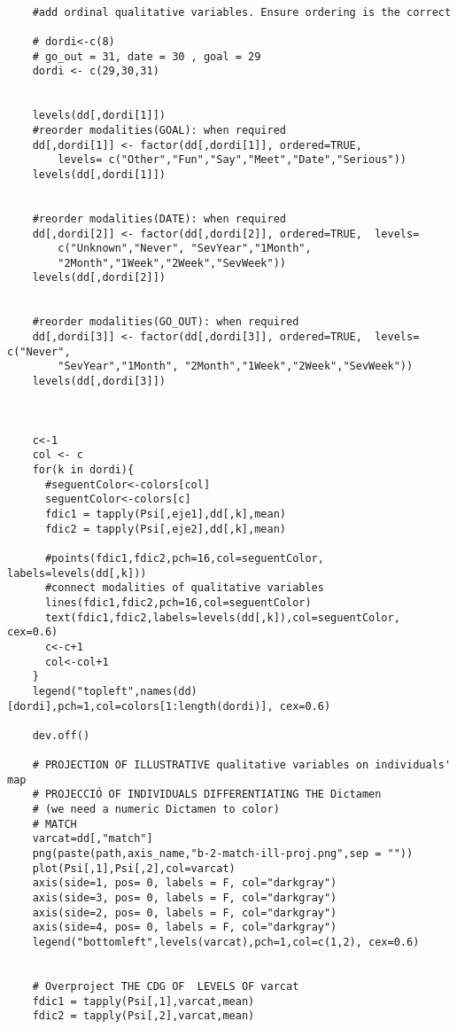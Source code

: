 \begin{verbatim}
    
    #add ordinal qualitative variables. Ensure ordering is the correct
    
    # dordi<-c(8)
    # go_out = 31, date = 30 , goal = 29
    dordi <- c(29,30,31)
    
    
    levels(dd[,dordi[1]])
    #reorder modalities(GOAL): when required
    dd[,dordi[1]] <- factor(dd[,dordi[1]], ordered=TRUE,
        levels= c("Other","Fun","Say","Meet","Date","Serious"))
    levels(dd[,dordi[1]])
    
    
    #reorder modalities(DATE): when required
    dd[,dordi[2]] <- factor(dd[,dordi[2]], ordered=TRUE,  levels= 
        c("Unknown","Never", "SevYear","1Month",
        "2Month","1Week","2Week","SevWeek"))
    levels(dd[,dordi[2]])
    
    
    #reorder modalities(GO_OUT): when required
    dd[,dordi[3]] <- factor(dd[,dordi[3]], ordered=TRUE,  levels= c("Never",
        "SevYear","1Month", "2Month","1Week","2Week","SevWeek"))
    levels(dd[,dordi[3]])
    
    
    
    c<-1
    col <- c
    for(k in dordi){
      #seguentColor<-colors[col]
      seguentColor<-colors[c]
      fdic1 = tapply(Psi[,eje1],dd[,k],mean)
      fdic2 = tapply(Psi[,eje2],dd[,k],mean)
      
      #points(fdic1,fdic2,pch=16,col=seguentColor, labels=levels(dd[,k]))
      #connect modalities of qualitative variables
      lines(fdic1,fdic2,pch=16,col=seguentColor)
      text(fdic1,fdic2,labels=levels(dd[,k]),col=seguentColor, cex=0.6)
      c<-c+1
      col<-col+1
    }
    legend("topleft",names(dd)[dordi],pch=1,col=colors[1:length(dordi)], cex=0.6)
    
    dev.off()
    
    # PROJECTION OF ILLUSTRATIVE qualitative variables on individuals' map
    # PROJECCIÓ OF INDIVIDUALS DIFFERENTIATING THE Dictamen
    # (we need a numeric Dictamen to color)
    # MATCH
    varcat=dd[,"match"]
    png(paste(path,axis_name,"b-2-match-ill-proj.png",sep = ""))
    plot(Psi[,1],Psi[,2],col=varcat)
    axis(side=1, pos= 0, labels = F, col="darkgray")
    axis(side=3, pos= 0, labels = F, col="darkgray")
    axis(side=2, pos= 0, labels = F, col="darkgray")
    axis(side=4, pos= 0, labels = F, col="darkgray")
    legend("bottomleft",levels(varcat),pch=1,col=c(1,2), cex=0.6)
    
    
    # Overproject THE CDG OF  LEVELS OF varcat
    fdic1 = tapply(Psi[,1],varcat,mean)
    fdic2 = tapply(Psi[,2],varcat,mean)
    

\end{verbatim}
